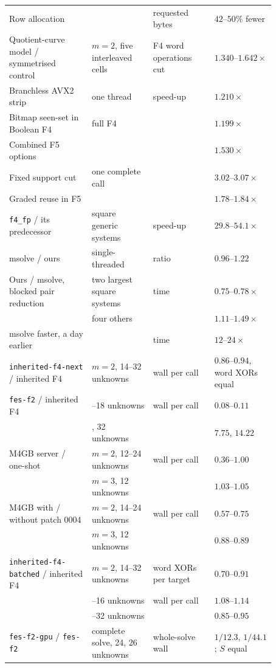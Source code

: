 \begin{table}[p]
\begin{tabular}{@{}>{\raggedright\arraybackslash}p{0.27\linewidth}>{\raggedright\arraybackslash}p{0.2\linewidth}>{\raggedright\arraybackslash}p{0.2\linewidth}>{\raggedleft\arraybackslash}p{0.2\linewidth}@{}}
Row allocation & & requested bytes & $42$--$50\%$ fewer \\
\addlinespace
Quotient-curve model / symmetrised control & $m=2$, five interleaved cells & F4 word operations cut & $1.340$--$1.642\times$ \\
\addlinespace
Branchless AVX2 strip & one thread & speed-up & $1.210\times$ \\
Bitmap seen-set in Boolean F4 & full F4 & & $1.199\times$ \\
Combined F5 options & & & $1.530\times$ \\
Fixed support cut & one complete call & & $3.02$--$3.07\times$ \\
Graded reuse in F5 & & & $1.78$--$1.84\times$ \\
\addlinespace
\texttt{f4\_fp} / its predecessor & square generic systems & speed-up & $29.8$--$54.1\times$ \\
msolve / ours & single-threaded & ratio & $0.96$--$1.22$ \\
Ours / msolve, blocked pair reduction & two largest square systems & time & $0.75$--$0.78\times$ \\
 & four others & & $1.11$--$1.49\times$ \\
msolve faster, a day earlier & & time & $12$--$24\times$ \\
\addlinespace
\texttt{inherited-f4-next} / inherited F4 & $m=2$, 14--32 unknowns & wall per call & $0.86$--$0.94$, word XORs equal \\
\texttt{fes-f2} / inherited F4 & 14--18 unknowns & wall per call & $0.08$--$0.11$ \\
 & 30, 32 unknowns & & $7.75$, $14.22$ \\
M4GB server / one-shot & $m=2$, 12--24 unknowns & wall per call & $0.36$--$1.00$ \\
 & $m=3$, 12 unknowns & & $1.03$--$1.05$ \\
M4GB with / without patch 0004 & $m=2$, 14--24 unknowns & wall per call & $0.57$--$0.75$ \\
 & $m=3$, 12 unknowns & & $0.88$--$0.89$ \\
\texttt{inherited-f4-batched} / inherited F4 & $m=2$, 14--32 unknowns & word XORs per target & $0.70$--$0.91$ \\
 & 14--16 unknowns & wall per call & $1.08$--$1.14$ \\
 & 24--32 unknowns & & $0.85$--$0.95$ \\
\texttt{fes-f2-gpu} / \texttt{fes-f2} & complete solve, 24, 26 unknowns & whole-solve wall & $1/12.3$, $1/44.1$; $S$ equal \\

\end{tabular}
\end{table}
